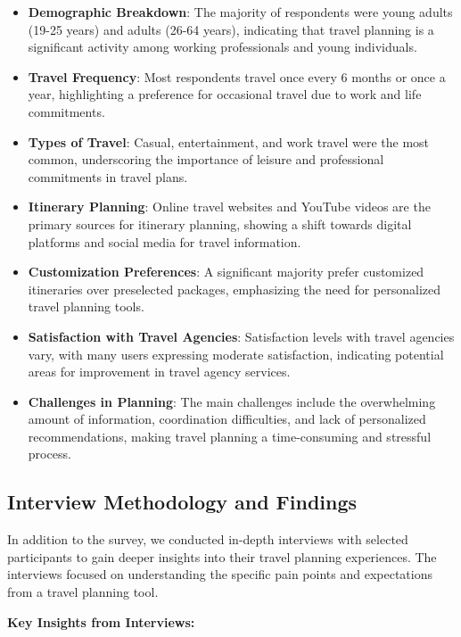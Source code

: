 \documentclass[conference]{IEEEtran}
\begin{document}
        \begin{itemize}
            \item \textbf{Demographic Breakdown}: The majority of respondents were young adults (19-25 years) and adults (26-64 years), indicating that travel planning is a significant activity among working professionals and young individuals.
            \item \textbf{Travel Frequency}: Most respondents travel once every 6 months or once a year, highlighting a preference for occasional travel due to work and life commitments.
            \item \textbf{Types of Travel}: Casual, entertainment, and work travel were the most common, underscoring the importance of leisure and professional commitments in travel plans.
            \item \textbf{Itinerary Planning}: Online travel websites and YouTube videos are the primary sources for itinerary planning, showing a shift towards digital platforms and social media for travel information.
            \item \textbf{Customization Preferences}: A significant majority prefer customized itineraries over preselected packages, emphasizing the need for personalized travel planning tools.
            \item \textbf{Satisfaction with Travel Agencies}: Satisfaction levels with travel agencies vary, with many users expressing moderate satisfaction, indicating potential areas for improvement in travel agency services.
            \item \textbf{Challenges in Planning}: The main challenges include the overwhelming amount of information, coordination difficulties, and lack of personalized recommendations, making travel planning a time-consuming and stressful process.
        \end{itemize}

    \subsection{Interview Methodology and Findings}
        In addition to the survey, we conducted in-depth interviews with selected participants to gain deeper insights into their travel planning experiences. The interviews focused on understanding the specific pain points and expectations from a travel planning tool.

        \textbf{Key Insights from Interviews:}
\end{document}
